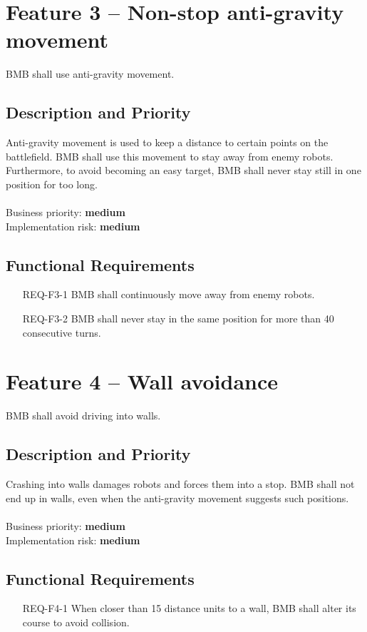 \documentclass{scrreprt}
\begin{document}
\section{Feature 3 -- Non-stop anti-gravity movement}
BMB shall use anti-gravity movement.
	
\subsection{Description and Priority}
Anti-gravity movement is used to keep a distance to certain points on the battlefield. BMB shall use this movement to stay away from enemy robots. Furthermore, to avoid becoming an easy target, BMB shall never stay still in one position for too long.\\\\Business priority: \textbf{medium}\\
Implementation risk: \textbf{medium}

\subsection{Functional Requirements}
\begin{itemize}
\item[REQ-F3-1] BMB shall continuously move away from enemy robots.
\item[REQ-F3-2] BMB shall never stay in the same position for more than 40 consecutive turns.
\end{itemize}

\section{Feature 4 -- Wall avoidance}
BMB shall avoid driving into walls.

\subsection{Description and Priority}
Crashing into walls damages robots and forces them into a stop. BMB shall not end up in walls, even when the anti-gravity movement suggests such positions.\\\\Business priority: \textbf{medium}\\
Implementation risk: \textbf{medium}

\subsection{Functional Requirements}
\begin{itemize}
\item[REQ-F4-1] When closer than 15 distance units to a wall, BMB shall alter its course to avoid collision.
\end{itemize}
\end{document}

